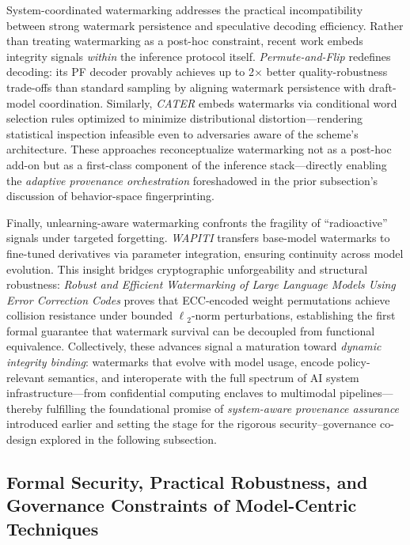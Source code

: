 \documentclass[11pt,a4paper]{article}
\begin{document}
System-coordinated watermarking addresses the practical incompatibility between strong watermark persistence and speculative decoding efficiency. Rather than treating watermarking as a post-hoc constraint, recent work embeds integrity signals \emph{within} the inference protocol itself. \emph{Permute-and-Flip} \cite{arxiv:2402.05864} redefines decoding: its PF decoder provably achieves up to 2$\times$ better quality-robustness trade-offs than standard sampling by aligning watermark persistence with draft-model coordination. Similarly, \emph{CATER} \cite{arxiv:2209.08773} embeds watermarks via conditional word selection rules optimized to minimize distributional distortion---rendering statistical inspection infeasible even to adversaries aware of the scheme's architecture. These approaches reconceptualize watermarking not as a post-hoc add-on but as a first-class component of the inference stack---directly enabling the \emph{adaptive provenance orchestration} foreshadowed in the prior subsection's discussion of behavior-space fingerprinting.

Finally, unlearning-aware watermarking confronts the fragility of ``radioactive'' signals under targeted forgetting. \emph{WAPITI} \cite{arxiv:2410.06467} transfers base-model watermarks to fine-tuned derivatives via parameter integration, ensuring continuity across model evolution. This insight bridges cryptographic unforgeability and structural robustness: \emph{Robust and Efficient Watermarking of Large Language Models Using Error Correction Codes} \cite{doi:10.56553/popets-2025-0126} proves that ECC-encoded weight permutations achieve collision resistance under bounded $\ell$$_{\mathrm{2}}$-norm perturbations, establishing the first formal guarantee that watermark survival can be decoupled from functional equivalence. Collectively, these advances signal a maturation toward \emph{dynamic integrity binding}: watermarks that evolve with model usage, encode policy-relevant semantics, and interoperate with the full spectrum of AI system infrastructure---from confidential computing enclaves to multimodal pipelines---thereby fulfilling the foundational promise of \emph{system-aware provenance assurance} introduced earlier and setting the stage for the rigorous security--governance co-design explored in the following subsection.


\subsection{Formal Security, Practical Robustness, and Governance Constraints of Model-Centric Techniques}
\end{document}
